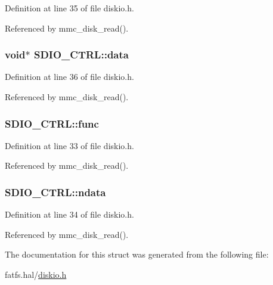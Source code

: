 Definition at line 35 of file diskio.\+h.



Referenced by mmc\+\_\+disk\+\_\+read().

\subsubsection[{\texorpdfstring{data}{data}}]{\setlength{\rightskip}{0pt plus 5cm}void$\ast$ S\+D\+I\+O\+\_\+\+C\+T\+R\+L\+::data}\hypertarget{structSDIO__CTRL_ab04c9adb4d3027a14925fb30b469f0c0}{}\label{structSDIO__CTRL_ab04c9adb4d3027a14925fb30b469f0c0}


Definition at line 36 of file diskio.\+h.



Referenced by mmc\+\_\+disk\+\_\+read().

\subsubsection[{\texorpdfstring{func}{func}}]{ S\+D\+I\+O\+\_\+\+C\+T\+R\+L\+::func}\hypertarget{structSDIO__CTRL_a2f0a17848a6c7c58f826d1888469e6e3}{}\label{structSDIO__CTRL_a2f0a17848a6c7c58f826d1888469e6e3}


Definition at line 33 of file diskio.\+h.



Referenced by mmc\+\_\+disk\+\_\+read().

\subsubsection[{\texorpdfstring{ndata}{ndata}}]{ S\+D\+I\+O\+\_\+\+C\+T\+R\+L\+::ndata}\hypertarget{structSDIO__CTRL_a44edc7d37688ac4f3a1ba3d66e909767}{}\label{structSDIO__CTRL_a44edc7d37688ac4f3a1ba3d66e909767}


Definition at line 34 of file diskio.\+h.



Referenced by mmc\+\_\+disk\+\_\+read().



The documentation for this struct was generated from the following file\+:\begin{DoxyCompactItemize}
\item 
fatfs.\+hal/\hyperlink{diskio_8h}{diskio.\+h}\end{DoxyCompactItemize}
